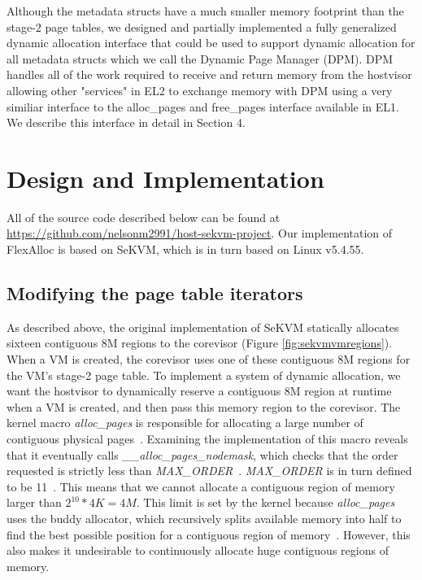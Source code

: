 Although the metadata structs have a much smaller memory footprint than the stage-2 page tables,
we designed and partially implemented a fully generalized dynamic allocation interface that
could be used to support dynamic allocation for all metadata structs which we call the
Dynamic Page Manager (DPM). DPM handles all of the work required to receive and return
memory from the hostvisor allowing other "services" in EL2 to exchange memory with DPM using
a very similiar interface to the alloc\_pages and free\_pages interface available in EL1. We describe
this interface in detail in Section 4.

\section{Design and Implementation}

All of the source code described below can be found at \url{https://github.com/nelsonm2991/host-sekvm-project}.
Our implementation of FlexAlloc is based on SeKVM, which is in turn based on Linux v5.4.55.

\subsection{Modifying the page table iterators}

As described above, the original implementation of SeKVM statically
allocates sixteen contiguous 8M regions to the corevisor (Figure \ref{fig:sekvmvmregions}). When a VM is created,
the corevisor uses one of these contiguous 8M regions for the VM's stage-2
page table. To implement a system of dynamic allocation, we want the hostvisor
to dynamically reserve a contiguous 8M region at runtime when a VM is created, and then
pass this memory region to the corevisor. The kernel macro \textit{alloc\_pages}
is responsible for allocating a large number of contiguous physical pages~\cite{kerneldocs}.
Examining the implementation of this macro reveals that it eventually
calls \textit{\_\_alloc\_pages\_nodemask}, which checks that the order requested
is strictly less than \textit{MAX\_ORDER}~\cite{page_alloc.c}. \textit{MAX\_ORDER}
is in turn defined to be 11~\cite{mmzone.h}. This means that we cannot allocate
a contiguous region of memory larger than $2^{10} * 4K = 4M$. This
limit is set by the kernel because \textit{alloc\_pages} uses the buddy allocator,
which recursively splits available memory into half to find the best possible position for
a contiguous region of memory~\cite{kerneldocs}. However, this also makes it
undesirable to continuously allocate huge contiguous regions of memory.

